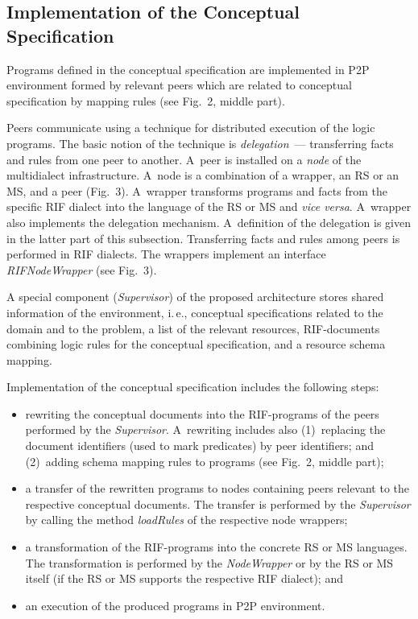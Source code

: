 \begin{multicols}{2}

\subsection{Implementation of the Conceptual Specification}

\noindent
  Programs defined in the conceptual specification are implemented in P2P
environment formed by relevant peers which are related to conceptual specification
by mapping rules (see Fig.~2, middle part).

  Peers communicate using a technique for distributed execution of the logic
programs. The basic notion of the technique is \textit{delegation}~--- transferring
facts and rules from one peer to another. A~peer is installed on a \textit{node} of the
multidialect infrastructure. A~node is a combination of a wrapper, an RS or an MS,
and a peer (Fig.~3). A~wrapper transforms programs and facts from the specific RIF
dialect into the language of the RS or MS and \textit{vice versa}. A~wrapper also implements
the delegation mechanism. A~definition of the delegation is given in the latter part of
this subsection. Transferring facts and rules among peers is performed in RIF dialects.
The wrappers implement an interface \textit{RIFNodeWrapper} (see Fig.~3).

  A special component (\textit{Supervisor}) of the proposed architecture stores
shared information of the environment, i.\,e., conceptual specifications related to the
domain and to the problem, a list of the relevant resources, RIF-documents combining
logic rules for the conceptual specification, and a resource schema mapping.



Implementation of the conceptual specification includes the following steps:
\begin{itemize}
\item rewriting the conceptual documents into the RIF-programs of the peers
performed by the \textit{Supervisor}. A~rewriting includes also (1)~replacing the
document identifiers (used to mark predicates) by peer identifiers; and (2)~adding
schema mapping rules to programs (see Fig.~2, middle part);
\item a transfer of the rewritten programs to nodes containing peers relevant to the
respective conceptual documents. The transfer is performed by the \textit{Supervisor}
by calling the method \textit{loadRules} of the respective node wrappers; 
\item a transformation of the RIF-programs into the concrete RS or MS languages.
The transformation is performed by the \textit{NodeWrapper} or by the RS or MS
itself (if the RS or MS supports the respective RIF dialect); and
\item an execution of the produced programs in P2P environment.
  \end{itemize}


\end{multicols}
